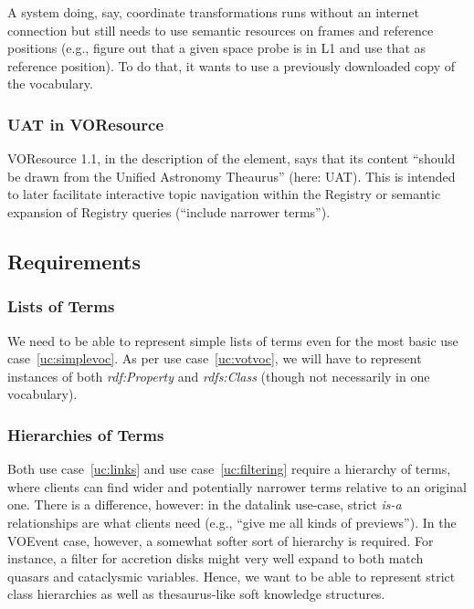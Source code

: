 \documentclass[11pt,a4paper]{ivoa}
\newcommand{\vocterm}[1]{\emph{\color{termcolor}#1}}
\begin{document}
A system doing, say, coordinate transformations runs without an internet
connection but still needs to use semantic resources on frames and
reference positions (e.g., figure out that a given space probe is in L1
and use that as reference position).  To do that, it wants to use a
previously downloaded copy of the vocabulary.

\subsubsection{UAT in VOResource}
\label{uc:uat}

VOResource 1.1, in the description of the  element, says
that its content ``should be drawn from the Unified Astronomy Theaurus''
(here: UAT).  This is intended to later facilitate interactive topic
navigation within the Registry or semantic expansion of Registry queries
(``include narrower terms'').


\subsection{Requirements}
\label{sect:requirements}

\subsubsection{Lists of Terms}
\label{req:lists}

We need to be able to represent simple lists of terms even for the most
basic use case~\ref{uc:simplevoc}.  As per
use case~\ref{uc:votvoc}, we will have to represent instances of both
\vocterm{rdf:Property} and \vocterm{rdfs:Class} (though not necessarily
in one vocabulary).

\subsubsection{Hierarchies of Terms}
\label{req:hierarchy}

Both use case~\ref{uc:links} and use case~\ref{uc:filtering} require a hierarchy
of terms, where clients can find wider and potentially narrower terms
relative to an original one.  There is a difference,
however: in the datalink use-case, strict \vocterm{is-a} relationships
are what clients need (e.g., ``give me all kinds of previews'').  In the
VOEvent case, however, a somewhat softer sort of hierarchy is required.
For instance, a filter for accretion disks might very well expand to
both match quasars and cataclysmic variables.  Hence, we want to
be able to represent strict class hierarchies as well as thesaurus-like
soft knowledge structures.
\end{document}
